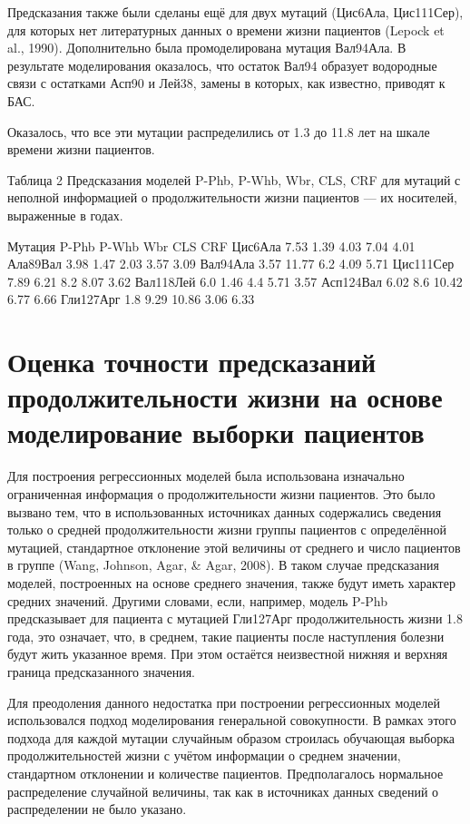 Предсказания также были сделаны ещё для двух мутаций (Цис6Ала, Цис111Сер), для которых нет литературных данных о времени жизни пациентов (Lepock et al., 1990).  
Дополнительно была промоделирована мутация Вал94Ала. В результате моделирования оказалось, что остаток Вал94 образует водородные связи с остатками Асп90 и Лей38, замены в которых, как известно, приводят к БАС.

Оказалось, что все эти мутации распределились от 1.3 до 11.8 лет на шкале времени жизни пациентов.

Таблица 2
Предсказания моделей  P-Phb, P-Whb, Wbr, CLS, CRF для мутаций с неполной информацией о продолжительности жизни пациентов — их носителей, выраженные в годах.

Мутация
P-Phb
P-Whb
Wbr
CLS
CRF
Цис6Ала
7.53
1.39
4.03
7.04
4.01
Ала89Вал
3.98
1.47
2.03
3.57
3.09
Вал94Ала
3.57
11.77
6.2
4.09
5.71
Цис111Сер
7.89
6.21
8.2
8.07
3.62
Вал118Лей
6.0
1.46
4.4
5.71
3.57
Асп124Вал
6.02
8.6
10.42
6.77
6.66
Гли127Арг
1.8
9.29
10.86
3.06
6.33

\section{Оценка точности предсказаний продолжительности жизни на основе моделирование выборки пациентов} \label{sect_MD_crossvalidation}

Для построения регрессионных моделей была использована изначально ограниченная информация о продолжительности жизни пациентов. Это было вызвано тем, что в использованных источниках данных содержались сведения только о средней продолжительности жизни группы пациентов с определённой мутацией, стандартное отклонение этой величины от среднего и число пациентов в группе (Wang, Johnson, Agar, \& Agar, 2008). В таком случае предсказания моделей, построенных на основе среднего значения, также будут иметь характер средних значений. Другими словами, если, например, модель P-Phb предсказывает для пациента с мутацией Гли127Арг продолжительность жизни 1.8 года, это означает, что, в среднем, такие пациенты после наступления болезни будут жить указанное время. При этом остаётся неизвестной нижняя и верхняя граница предсказанного значения.

Для преодоления данного недостатка при построении регрессионных моделей использовался подход моделирования генеральной совокупности. В рамках этого подхода для каждой мутации случайным образом строилась обучающая выборка продолжительностей жизни с учётом информации о среднем значении, стандартном отклонении и количестве пациентов. Предполагалось нормальное распределение случайной величины, так как в источниках данных сведений о распределении не было указано. 


